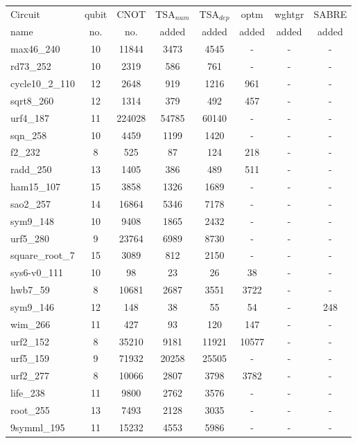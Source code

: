 \documentclass[journal]{IEEEtran}
\begin{document}
        \begin{table*}[htbp]
            \begin{center}  
            \begin{tabular}{|p{4.3cm}<{\centering}|c|c|c|c|c|c|c|}
            \hline
            Circuit &  qubit  & CNOT &TSA$_{num}$& TSA$_{dep}$  & optm 	 & wghtgr  &SABRE 	\\
             name	&   no. 	&	no. & added&  added &  added 	&  added&  added\\
            \hline
            max46\_240 & 10 & 11844 & 3473 & 4545 & - & -& - \\
rd73\_252 & 10 & 2319 & 586 & 761 & - & -& - \\
cycle10\_2\_110 & 12 & 2648 & 919 & 1216 & 961 & -& - \\
sqrt8\_260 & 12 & 1314 & 379 & 492 & 457 & -& - \\
urf4\_187 & 11 & 224028 & 54785 & 60140 & - & -& - \\
sqn\_258 & 10 & 4459 & 1199 & 1420 & - & -& - \\
f2\_232 & 8 & 525 & 87 & 124 & 218 & -& - \\
radd\_250 & 13 & 1405 & 386 & 489 & 511 & -& - \\
ham15\_107 & 15 & 3858 & 1326 & 1689 & - & -& - \\
sao2\_257 & 14 & 16864 & 5346 & 7178 & - & -& - \\
sym9\_148 & 10 & 9408 & 1865 & 2432 & - & -& - \\
urf5\_280 & 9 & 23764 & 6989 & 8730 & - & -& - \\
square\_root\_7 & 15 & 3089 & 812 & 2150 & - & -& - \\
sys6-v0\_111 & 10 & 98 & 23 & 26 & 38 & -& - \\
hwb7\_59 & 8 & 10681 & 2687 & 3551 & 3722 & -& - \\
sym9\_146 & 12 & 148 & 38 & 55 & 54 & -& 248 \\
wim\_266 & 11 & 427 & 93 & 120 & 147 & -& - \\
urf2\_152 & 8 & 35210 & 9181 & 11921 & 10577 & -& - \\
urf5\_159 & 9 & 71932 & 20258 & 25505 & - & -& - \\
urf2\_277 & 8 & 10066 & 2807 & 3798 & 3782 & -& - \\
life\_238 & 11 & 9800 & 2762 & 3576 & - & -& - \\
root\_255 & 13 & 7493 & 2128 & 3035 & - & -& - \\
9symml\_195 & 11 & 15232 & 4553 & 5986 & - & -& - \\

\end{tabular}
\end{center}
\end{table*}
\end{document}
